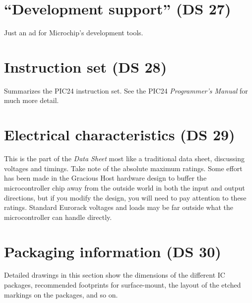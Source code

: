 
\section{``Development support'' (DS 27)}

Just an ad for Microchip's development tools.


\section{Instruction set (DS 28)}

Summarizes the PIC24 instruction set.  See the PIC24 \emph{Programmer's
Manual} for much more detail.


\section{Electrical characteristics (DS 29)}

This is the part of the \emph{Data Sheet} most like a traditional data
sheet, discussing voltages and timings.  Take note of the absolute maximum
ratings.  Some effort has been made in the Gracious Host hardware design to
buffer the microcontroller chip away from the outside world in both the
input and output directions, but if you modify the design, you will need to
pay attention to these ratings.  Standard Eurorack voltages and loads may be
far outside what the microcontroller can handle directly.


\section{Packaging information (DS 30)}

Detailed drawings in this section show the dimensions of the different
IC packages, recommended footprints for surface-mount, the layout of the
etched markings on the packages, and so on.
